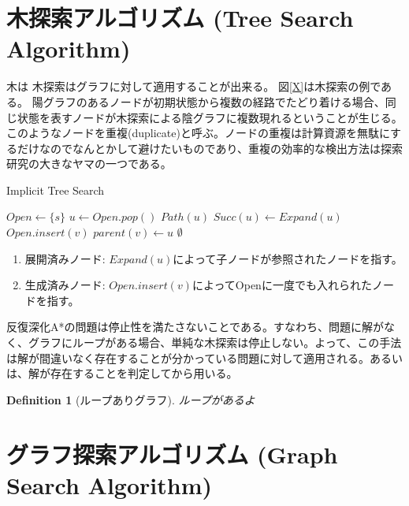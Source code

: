 \documentclass{book}
\newtheorem{definition}{Definition}
\begin{document}
\section{木探索アルゴリズム (Tree Search Algorithm)}
\label{sec:tree-search-algorithm}
木は
木探索はグラフに対して適用することが出来る。
図\ref{X}は木探索の例である。
陽グラフのあるノードが初期状態から複数の経路でたどり着ける場合、同じ状態を表すノードが木探索による陰グラフに複数現れるということが生じる。このようなノードを重複(duplicate)と呼ぶ。ノードの重複は計算資源を無駄にするだけなのでなんとかして避けたいものであり、重複の効率的な検出方法は探索研究の大きなヤマの一つである。


\begin{algorithm}
\caption{Implicit Tree Search}
\label{alg:implicit-tree-search}
	$Open \leftarrow \{s\}$\;
	 {
		$u \leftarrow Open.pop()$\;
		 {
			\Return $Path(u)$\;
		}
		$Succ(u) \leftarrow Expand(u)$\;
		 {
			$Open.insert(v)$\;
			$parent(v) \leftarrow u$\;
		}
 	}
	\Return $\emptyset$\;
\end{algorithm}

\begin{enumerate}
\item 展開済みノード: $Expand(u)$によって子ノードが参照されたノードを指す。
\item 生成済みノード: $Open.insert(v)$によってOpenに一度でも入れられたノードを指す。

\end{enumerate}

反復深化A*の問題は停止性を満たさないことである。すなわち、問題に解がなく、グラフにループがある場合、単純な木探索は停止しない。よって、この手法は解が間違いなく存在することが分かっている問題に対して適用される。あるいは、解が存在することを判定してから用いる。
\begin{definition}[ループありグラフ]
ループがあるよ
\end{definition}

\section{グラフ探索アルゴリズム (Graph Search Algorithm)}
\label{sec:graph-search-algorithm}
\end{document}
